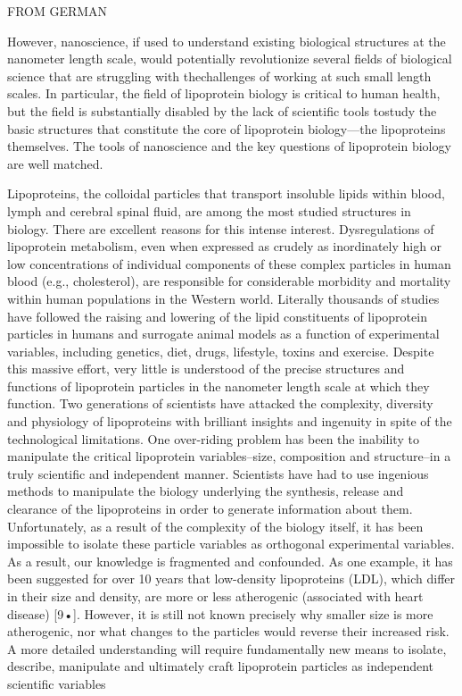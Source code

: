 FROM GERMAN

However, nanoscience, if used to understand existing biological structures at the nanometer length scale, would potentially revolutionize several fields of biological science that are struggling with thechallenges of working at such small length scales. In particular, the field of lipoprotein biology is critical to human health, but the field is substantially disabled by the lack of scientific tools tostudy the basic structures that constitute the core of lipoprotein biology—the lipoproteins themselves. The tools of nanoscience and the key questions of lipoprotein biology are well matched. 

Lipoproteins, the colloidal particles that transport insoluble lipids within blood, lymph and
cerebral spinal fluid, are among the most studied structures in biology. There are excellent
reasons for this intense interest. Dysregulations of lipoprotein metabolism, even when
expressed as crudely as inordinately high or low concentrations of individual components of
these complex particles in human blood (e.g., cholesterol), are responsible for considerable
morbidity and mortality within human populations in the Western world. Literally thousands
of studies have followed the raising and lowering of the lipid constituents of lipoprotein
particles in humans and surrogate animal models as a function of experimental variables,
including genetics, diet, drugs, lifestyle, toxins and exercise. Despite this massive effort, very
little is understood of the precise structures and functions of lipoprotein particles in the
nanometer length scale at which they function.
Two generations of scientists have attacked the complexity, diversity and physiology of
lipoproteins with brilliant insights and ingenuity in spite of the technological limitations. One
over-riding problem has been the inability to manipulate the critical lipoprotein variables–size,
composition and structure–in a truly scientific and independent manner. Scientists have had to
use ingenious methods to manipulate the biology underlying the synthesis, release and
clearance of the lipoproteins in order to generate information about them. Unfortunately, as a
result of the complexity of the biology itself, it has been impossible to isolate these particle
variables as orthogonal experimental variables. As a result, our knowledge is fragmented and
confounded. As one example, it has been suggested for over 10 years that low-density
lipoproteins (LDL), which differ in their size and density, are more or less atherogenic
(associated with heart disease) [9•]. However, it is still not known precisely why smaller size
is more atherogenic, nor what changes to the particles would reverse their increased risk. A
more detailed understanding will require fundamentally new means to isolate, describe,
manipulate and ultimately craft lipoprotein particles as independent scientific variables

